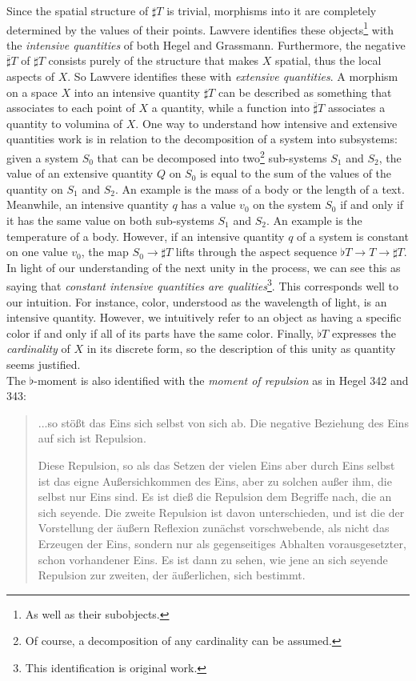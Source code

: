 \documentclass{article}
\begin{document}
Since the spatial structure of $\sharp T$ is trivial, morphisms into it are completely determined by the values of their points. Lawvere identifies these objects\footnote{As well as their subobjects.} with the \emph{intensive quantities} of both Hegel and Grassmann\cite{Grass}. Furthermore, the negative $\overline{\sharp} T$ of $\sharp T$ consists purely of the structure that makes $X$ spatial, thus the local aspects of $X$. So Lawvere identifies these with \emph{extensive quantities}. A morphism on a space $X$ into an intensive quantity $\sharp T$ can be described as something that associates to each point of $X$ a quantity, while a function into $\overline{\sharp} T$ associates a quantity to volumina of $X$. One way to understand how intensive and extensive quantities work is in relation to the decomposition of a system into subsystems\cite{nlabie}: given a system $S_0$ that can be decomposed into two\footnote{Of course, a decomposition of any cardinality can be assumed.} sub-systems $S_1$ and $S_2$, the value of an extensive quantity $Q$ on $S_0$ is equal to the sum of the values of the quantity on $S_1$ and $S_2$. An example is the mass of a body or the length of a text. Meanwhile, an intensive quantity $q$ has a value $v_0$ on the system $S_0$ if and only if it has the same value on both sub-systems $S_1$ and $S_2$. An example is the temperature of a body. However, if an intensive quantity $q$ of a system is constant on one value $v_0$, the map $S_0\rightarrow\sharp T$ lifts through the aspect sequence $\flat T\rightarrow T\rightarrow\sharp T$. In light of our understanding of the next unity in the process, we can see this as saying that \emph{constant intensive quantities are qualities}\footnote{This identification is original work.}. This corresponds well to our intuition. For instance, color, understood as the wavelength of light, is an intensive quantity. However, we intuitively refer to an object as having a specific color if and only if all of its parts have the same color. Finally, $\flat T$ expresses the \emph{cardinality} of $X$ in its discrete form, so the description of this unity as quantity seems justified. \\

The $\flat$-moment is also identified with the \emph{moment of repulsion} as in Hegel 342 and 343:

\begin{quote}
    ...so stößt das Eins sich selbst von sich ab. Die negative Beziehung des Eins auf sich ist Repulsion.

    Diese Repulsion, so als das Setzen der vielen Eins aber durch Eins selbst ist das eigne Außersichkommen des Eins, aber zu solchen außer ihm, die selbst nur Eins sind. Es ist dieß die Repulsion dem Begriffe nach, die an sich seyende. Die zweite Repulsion ist davon unterschieden, und ist die der Vorstellung der äußern Reflexion zunächst vorschwebende, als nicht das Erzeugen der Eins, sondern nur als gegenseitiges Abhalten vorausgesetzter, schon vorhandener Eins. Es ist dann zu sehen, wie jene an sich seyende Repulsion zur zweiten, der äußerlichen, sich bestimmt.
\end{quote}
\end{document}

